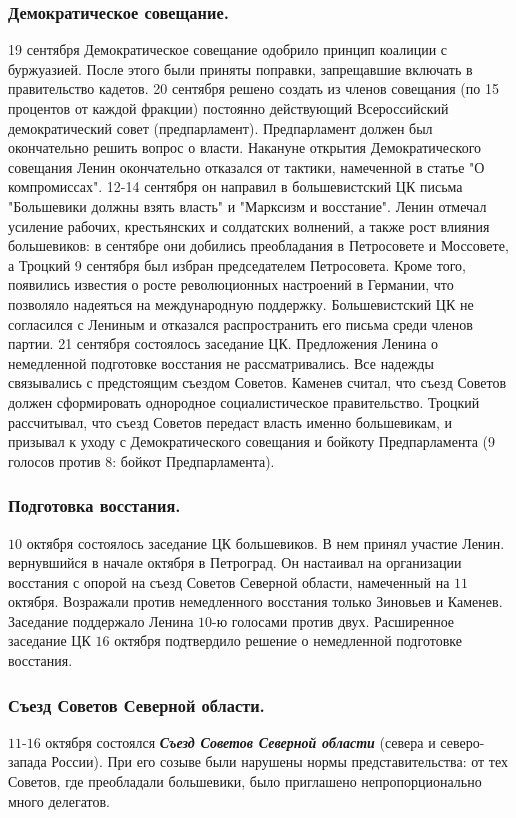 \documentclass[12pt]{article}
\begin{document}
	\subsubsection{Демократическое совещание.}
	19 сентября Демократическое совещание одобрило принцип коалиции с буржуазией. После этого были приняты поправки, запрещавшие включать в правительство кадетов.  20 сентября решено создать из членов совещания (по 15 процентов от каждой фракции) постоянно действующий Всероссийский демократический совет (предпарламент). Предпарламент должен был окончательно решить вопрос о власти. Накануне открытия Демократического совещания Ленин окончательно отказался от тактики, намеченной в статье "О компромиссах". 12-14 сентября он направил в большевистский ЦК письма "Большевики должны взять власть" и "Марксизм и восстание". Ленин отмечал усиление рабочих, крестьянских и солдатских волнений, а также рост влияния большевиков: в сентябре они добились преобладания в Петросовете и Моссовете, а Троцкий 9 сентября был избран председателем Петросовета. Кроме того, появились известия о росте революционных настроений в Германии, что позволяло надеяться на международную поддержку. Большевистский ЦК не согласился с Лениным и отказался распространить его письма среди членов партии. 21 сентября состоялось заседание ЦК. Предложения Ленина о немедленной подготовке восстания не рассматривались. Все надежды связывались с предстоящим съездом Советов. Каменев считал, что съезд Советов должен сформировать однородное социалистическое правительство. Троцкий рассчитывал, что съезд Советов передаст власть именно большевикам, и призывал к уходу с Демократического совещания и бойкоту Предпарламента (9 голосов против 8: бойкот Предпарламента).
	\subsubsection{Подготовка восстания.}
	$10$ октября состоялось заседание ЦК большевиков. В нем принял участие Ленин. вернувшийся в начале октября в Петроград. Он настаивал на организации восстания с опорой на съезд Советов Северной области, намеченный на $11$ октября. Возражали против немедленного восстания только Зиновьев и Каменев. Заседание поддержало Ленина $10$-ю голосами против двух. Расширенное заседание ЦК $16$ октября подтвердило решение о немедленной подготовке восстания.
	\subsubsection{Съезд Советов Северной области.}
	$11$-$16$ октября состоялся \textbf{\textit{Съезд Советов Северной области}} (севера и северо-запада России). При его созыве были нарушены нормы представительства: от тех Советов, где преобладали большевики, было приглашено непропорционально много делегатов.
\end{document}
